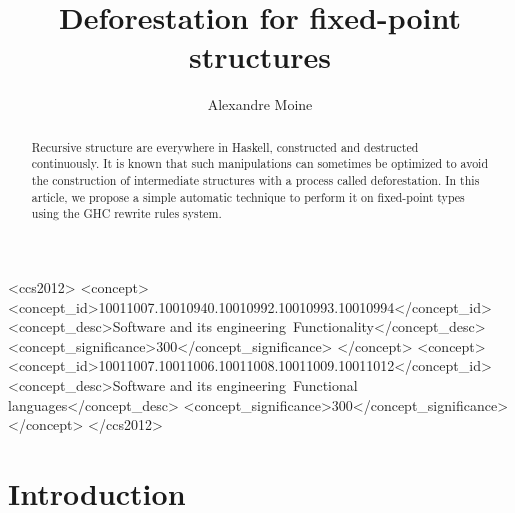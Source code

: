\documentclass[format=sigplan]{acmart}
\begin{document}
\title{Deforestation for fixed-point structures}
\author{Alexandre Moine}


\begin{abstract}
Recursive structure are everywhere in Haskell, constructed and destructed continuously. It is known that such manipulations can sometimes be optimized to avoid the construction of intermediate structures with a process called deforestation. In this article, we propose a simple automatic technique to perform it on fixed-point types using the GHC rewrite rules system.
\end{abstract}

%

\begin{CCSXML}
	<ccs2012>
	<concept>
	<concept_id>10011007.10010940.10010992.10010993.10010994</concept_id>
	<concept_desc>Software and its engineering~Functionality</concept_desc>
	<concept_significance>300</concept_significance>
	</concept>
	<concept>
	<concept_id>10011007.10011006.10011008.10011009.10011012</concept_id>
	<concept_desc>Software and its engineering~Functional languages</concept_desc>
	<concept_significance>300</concept_significance>
	</concept>
	</ccs2012>
\end{CCSXML}



%


%
\maketitle

\section{Introduction}
\end{document}
